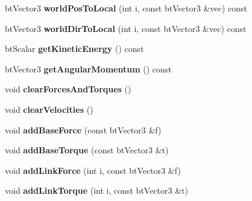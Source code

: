 \begin{DoxyCompactItemize}
\item 
\hypertarget{classbt_multi_body_ab25c5f6a332dbcc6235f9f0f7ffa48f4}{bt\+Vector3 {\bfseries world\+Pos\+To\+Local} (int i, const bt\+Vector3 \&vec) const }\label{classbt_multi_body_ab25c5f6a332dbcc6235f9f0f7ffa48f4}

\item 
\hypertarget{classbt_multi_body_a175e28556fe987082261b87dcc89ef39}{bt\+Vector3 {\bfseries world\+Dir\+To\+Local} (int i, const bt\+Vector3 \&vec) const }\label{classbt_multi_body_a175e28556fe987082261b87dcc89ef39}

\item 
\hypertarget{classbt_multi_body_a25b316255d50d8fba25372ee986e1ca1}{bt\+Scalar {\bfseries get\+Kinetic\+Energy} () const }\label{classbt_multi_body_a25b316255d50d8fba25372ee986e1ca1}

\item 
\hypertarget{classbt_multi_body_a5ce0340d6f9655dd73a12413458ac2a2}{bt\+Vector3 {\bfseries get\+Angular\+Momentum} () const }\label{classbt_multi_body_a5ce0340d6f9655dd73a12413458ac2a2}

\item 
\hypertarget{classbt_multi_body_aff9f8aa773319219146b7f1aa5849e8e}{void {\bfseries clear\+Forces\+And\+Torques} ()}\label{classbt_multi_body_aff9f8aa773319219146b7f1aa5849e8e}

\item 
\hypertarget{classbt_multi_body_a504c9eb4bba7d799b76b3a5c2e59a2c1}{void {\bfseries clear\+Velocities} ()}\label{classbt_multi_body_a504c9eb4bba7d799b76b3a5c2e59a2c1}

\item 
\hypertarget{classbt_multi_body_af485aabee052a04aafab737ed6d45c09}{void {\bfseries add\+Base\+Force} (const bt\+Vector3 \&f)}\label{classbt_multi_body_af485aabee052a04aafab737ed6d45c09}

\item 
\hypertarget{classbt_multi_body_a57545c47299f1a3ec305461e6ec6b5c4}{void {\bfseries add\+Base\+Torque} (const bt\+Vector3 \&t)}\label{classbt_multi_body_a57545c47299f1a3ec305461e6ec6b5c4}

\item 
\hypertarget{classbt_multi_body_a7c3897d0dc78fae74b1f665349596713}{void {\bfseries add\+Link\+Force} (int i, const bt\+Vector3 \&f)}\label{classbt_multi_body_a7c3897d0dc78fae74b1f665349596713}

\item 
\hypertarget{classbt_multi_body_a6fca672a0de1e44a828e2ed2b2bfca3b}{void {\bfseries add\+Link\+Torque} (int i, const bt\+Vector3 \&t)}\label{classbt_multi_body_a6fca672a0de1e44a828e2ed2b2bfca3b}


\end{DoxyCompactItemize}
